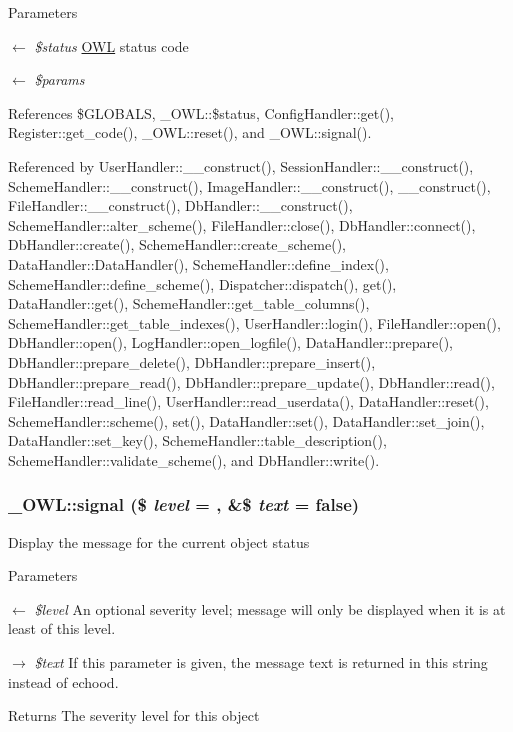 \begin{DoxyParams}{Parameters}
\item[\mbox{$\leftarrow$} {\em \$status}]\hyperlink{classOWL}{OWL} status code \item[\mbox{$\leftarrow$} {\em \$params}]\end{DoxyParams}


References \$GLOBALS, \_\-OWL::\$status, ConfigHandler::get(), Register::get\_\-code(), \_\-OWL::reset(), and \_\-OWL::signal().



Referenced by UserHandler::\_\-\_\-construct(), SessionHandler::\_\-\_\-construct(), SchemeHandler::\_\-\_\-construct(), ImageHandler::\_\-\_\-construct(), \_\-\_\-construct(), FileHandler::\_\-\_\-construct(), DbHandler::\_\-\_\-construct(), SchemeHandler::alter\_\-scheme(), FileHandler::close(), DbHandler::connect(), DbHandler::create(), SchemeHandler::create\_\-scheme(), DataHandler::DataHandler(), SchemeHandler::define\_\-index(), SchemeHandler::define\_\-scheme(), Dispatcher::dispatch(), get(), DataHandler::get(), SchemeHandler::get\_\-table\_\-columns(), SchemeHandler::get\_\-table\_\-indexes(), UserHandler::login(), FileHandler::open(), DbHandler::open(), LogHandler::open\_\-logfile(), DataHandler::prepare(), DbHandler::prepare\_\-delete(), DbHandler::prepare\_\-insert(), DbHandler::prepare\_\-read(), DbHandler::prepare\_\-update(), DbHandler::read(), FileHandler::read\_\-line(), UserHandler::read\_\-userdata(), DataHandler::reset(), SchemeHandler::scheme(), set(), DataHandler::set(), DataHandler::set\_\-join(), DataHandler::set\_\-key(), SchemeHandler::table\_\-description(), SchemeHandler::validate\_\-scheme(), and DbHandler::write().

\subsubsection[{signal}]{\setlength{\rightskip}{0pt plus 5cm}\_\-OWL::signal (\$ {\em level} = {}, \/  \&\$ {\em text} = {\ttfamily false})}\label{class__OWL_a51ba4a16409acf2a2f61f286939091a5}
Display the message for the current object status


\begin{DoxyParams}{Parameters}
\item[\mbox{$\leftarrow$} {\em \$level}]An optional severity level; message will only be displayed when it is at least of this level. \item[\mbox{$\rightarrow$} {\em \$text}]If this parameter is given, the message text is returned in this string instead of echood. \end{DoxyParams}
\begin{DoxyReturn}{Returns}
The severity level for this object 
\end{DoxyReturn}


